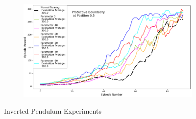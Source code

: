 \documentclass[journal]{IEEEtran}
\begin{document}
\begin{figure}[H]
\begin{subfigure}[b]{0.5\textwidth}
      \centering
      \includegraphics[width=\textwidth]{Inverted_Pendulum_with_Boundary_at_0.5.png}
    \end{subfigure}
    \caption{Inverted Pendulum Experiments}
    \label{fig:InvertedPendulum}
\end{figure}
\end{document}
